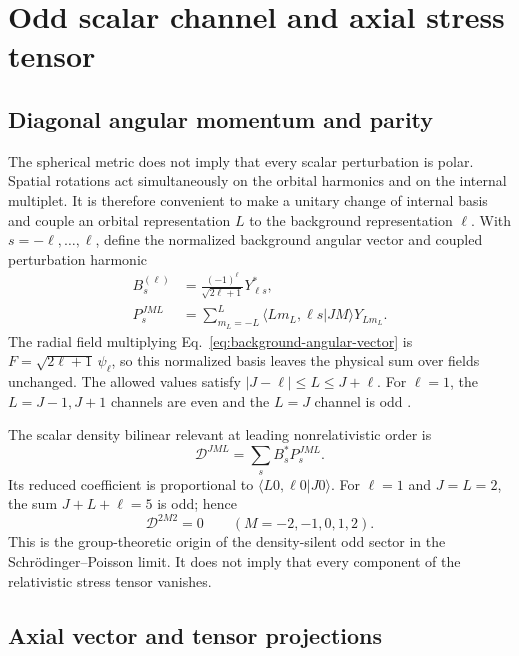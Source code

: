 \section{Odd scalar channel and axial stress tensor}\label{sec:axial-channel}

\subsection{Diagonal angular momentum and parity}

The spherical metric does not imply that every scalar perturbation is polar.
Spatial rotations act simultaneously on the orbital harmonics and on the
internal multiplet. It is therefore convenient to make a unitary change of
internal basis and couple an orbital representation $L$ to the background
representation $\ell$. With $s=-\ell,\ldots,\ell$, define the normalized
background angular vector and coupled perturbation harmonic
\begin{align}
B_s^{(\ell)}&=\frac{(-1)^\ell}{\sqrt{2\ell+1}}Y_{\ell s}^{*},
\label{eq:background-angular-vector}\\
P_s^{JML}&=\sum_{m_L=-L}^{L}
\langle Lm_L,\ell s\vert JM\rangle Y_{Lm_L}.
\label{eq:coupled-harmonic}
\end{align}
The radial field multiplying Eq.~\eqref{eq:background-angular-vector} is
$F=\sqrt{2\ell+1}\,\psi_\ell$, so this normalized basis leaves the physical
sum over fields unchanged. The allowed values satisfy
$|J-\ell|\leq L\leq J+\ell$. For $\ell=1$, the $L=J-1,J+1$ channels are even
and the $L=J$ channel is odd \cite{ChavezNambo2024}.

The scalar density bilinear relevant at leading nonrelativistic order is
\begin{equation}
\mathcal D^{JML}=\sum_s B_s^{*}P_s^{JML}.
\label{eq:density-bilinear}
\end{equation}
Its reduced coefficient is proportional to
$\langle L0,\ell0\vert J0\rangle$. For $\ell=1$ and $J=L=2$, the sum
$J+L+\ell=5$ is odd; hence
\begin{equation}
\mathcal D^{2M2}=0
\qquad (M=-2,-1,0,1,2).
\label{eq:density-null}
\end{equation}
This is the group-theoretic origin of the density-silent odd sector in the
Schr\"odinger--Poisson limit. It does not imply that every component of the
relativistic stress tensor vanishes.

\subsection{Axial vector and tensor projections}

